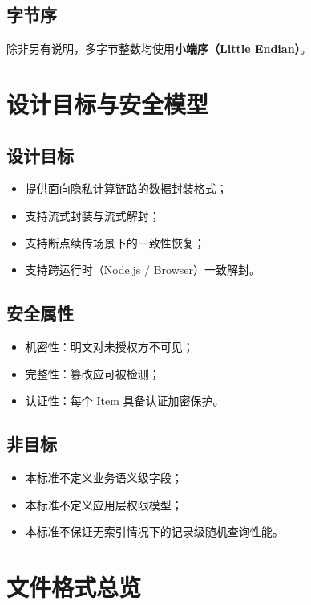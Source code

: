 \documentclass[11pt,a4paper]{article}
\begin{document}
\subsection{字节序}
除非另有说明，多字节整数均使用\textbf{小端序（Little Endian）}。

\section{设计目标与安全模型}
\subsection{设计目标}
\begin{itemize}
  \item 提供面向隐私计算链路的数据封装格式；
  \item 支持流式封装与流式解封；
  \item 支持断点续传场景下的一致性恢复；
  \item 支持跨运行时（Node.js / Browser）一致解封。
\end{itemize}

\subsection{安全属性}
\begin{itemize}
  \item 机密性：明文对未授权方不可见；
  \item 完整性：篡改应可被检测；
  \item 认证性：每个 Item 具备认证加密保护。
\end{itemize}

\subsection{非目标}
\begin{itemize}
  \item 本标准不定义业务语义级字段；
  \item 本标准不定义应用层权限模型；
  \item 本标准不保证无索引情况下的记录级随机查询性能。
\end{itemize}

\section{文件格式总览}
\end{document}
